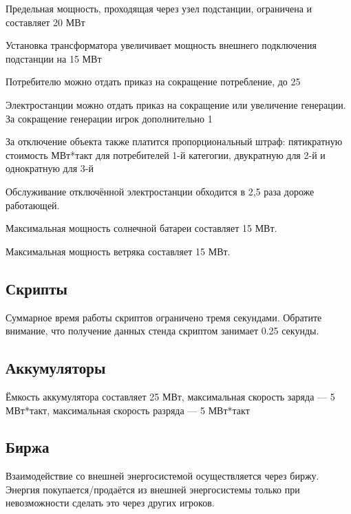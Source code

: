 Предельная мощность, проходящая через узел подстанции, ограничена и составляет 20 МВт

Установка трансформатора увеличивает мощность внешнего подключения подстанции на 15 МВт

Потребителю можно отдать приказ на сокращение потребление, до 25%

Электростанции можно отдать приказ на сокращение или увеличение генерации. За сокращение генерации игрок дополнительно 1%

За отключение объекта также платится пропорциональный штраф: пятикратную стоимость МВт*такт для потребителей 1-й категогии, двукратную для 2-й и однократную для 3-й

Обслуживание отключённой электростанции обходится в 2,5 раза дороже работающей.

Максимальная мощность солнечной батареи составляет 15 МВт.

Максимальная мощность ветряка составляет 15 МВт.

\subsection*{Скрипты}

Суммарное время работы скриптов ограничено тремя секундами. Обратите внимание, что получение данных стенда скриптом занимает 0.25 секунды.

\subsection*{Аккумуляторы}

Ёмкость аккумулятора составляет 25 МВт, максимальная скорость заряда — 5 МВт*такт, максимальная скорость разряда — 5 МВт*такт 

\subsection*{Биржа}

Взаимодействие со внешней энергосистемой осуществляется через биржу. Энергия покупается/продаётся из внешней энергосистемы только при невозможности сделать это через других игроков.

